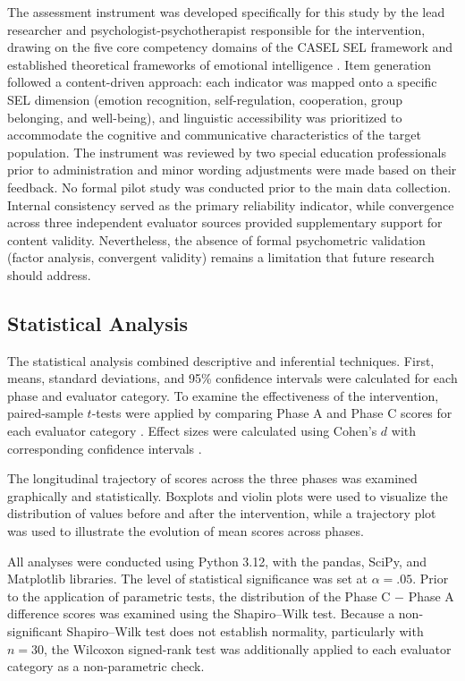 \documentclass[12pt,a4paper]{article}
\begin{document}
The assessment instrument was developed specifically for this study
by the lead researcher and psychologist-psychotherapist responsible
for the intervention, drawing on the five core competency domains
of the CASEL SEL framework \parencite{casel2020} and established
theoretical frameworks of emotional intelligence \parencite{goleman1995}.
Item generation followed a content-driven approach: each indicator
was mapped onto a specific SEL dimension (emotion recognition,
self-regulation, cooperation, group belonging, and well-being),
and linguistic accessibility was prioritized to accommodate the
cognitive and communicative characteristics of the target population.
The instrument was reviewed by two special education professionals
prior to administration and minor wording adjustments were made
based on their feedback. No formal pilot study was conducted prior
to the main data collection. Internal consistency served as the
primary reliability indicator, while convergence across three
independent evaluator sources provided supplementary support for
content validity. Nevertheless, the absence of formal psychometric
validation (factor analysis, convergent validity) remains a
limitation that future research should address.

\subsection{Statistical Analysis}

The statistical analysis combined descriptive and inferential techniques. First, means, standard deviations, and 95\% confidence intervals were calculated for each phase and evaluator category. To examine the effectiveness of the intervention, paired-sample $t$-tests were applied by comparing Phase A and Phase C scores for each evaluator category \parencite{student1908}. Effect sizes were calculated using Cohen's $d$ with corresponding confidence intervals \parencite{cohen1988}.

The longitudinal trajectory of scores across the three phases was examined graphically and statistically. Boxplots and violin plots were used to visualize the distribution of values before and after the intervention, while a trajectory plot was used to illustrate the evolution of mean scores across phases.

All analyses were conducted using Python 3.12, with the pandas, SciPy, and Matplotlib libraries. The level of statistical significance was set at $\alpha=.05$. Prior to the application of parametric tests, the distribution of the Phase C $-$ Phase A difference scores was examined using the Shapiro--Wilk test. Because a non-significant Shapiro--Wilk test does not establish normality, particularly with $n = 30$, the Wilcoxon signed-rank test was additionally applied to each evaluator category as a non-parametric check.
\end{document}
